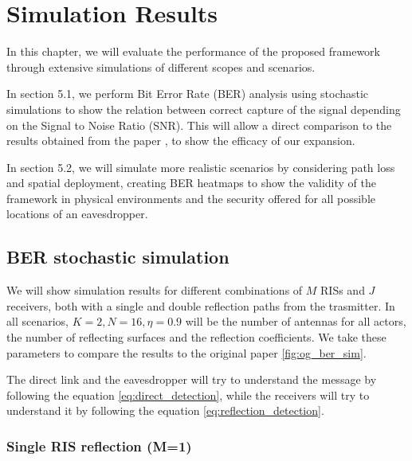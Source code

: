 \section{Simulation Results}

In this chapter, we will evaluate the performance of the proposed framework through extensive simulations of different scopes and scenarios.

In section 5.1, we perform Bit Error Rate (BER) analysis using stochastic simulations to show the relation between correct capture of the signal depending on the Signal to Noise Ratio (SNR). This will allow a direct comparison to the results obtained from the paper \cite{9328149}, to show the efficacy of our expansion.

In section 5.2, we will simulate more realistic scenarios by considering path loss and spatial deployment, creating BER heatmaps to show the validity of the framework in physical environments and the security offered for all possible locations of an eavesdropper.

\subsection{BER stochastic simulation}

We will show simulation results for different combinations of $M$ RISs and $J$ receivers, both with a single and double reflection paths from the trasmitter. In all scenarios, $K = 2, N = 16, \eta = 0.9$ will be the number of antennas for all actors, the number of reflecting surfaces and the reflection coefficients. We take these parameters to compare the results to the original paper \cite{9328149} \ref{fig:og_ber_sim}.

The direct link and the eavesdropper will try to understand the message by following the equation \eqref{eq:direct_detection}, while the receivers will try to understand it by following the equation \eqref{eq:reflection_detection}.

\subsubsection{Single RIS reflection (M=1)}


